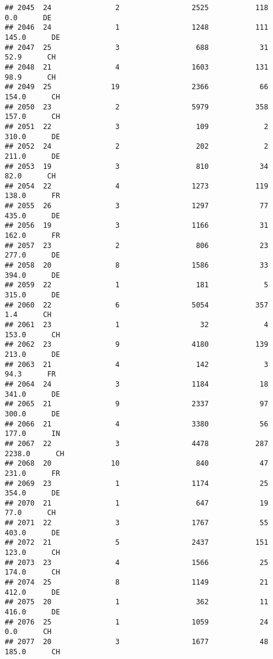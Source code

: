 \documentclass[
]{article}
\begin{document}
\begin{verbatim}
## 2045  24               2                 2525           118      0.0      DE
## 2046  24               1                 1248           111    145.0      DE
## 2047  25               3                  688            31     52.9      CH
## 2048  21               4                 1603           131     98.9      CH
## 2049  25              19                 2366            66    154.0      CH
## 2050  23               2                 5979           358    157.0      CH
## 2051  22               3                  109             2    310.0      DE
## 2052  24               2                  202             2    211.0      DE
## 2053  19               3                  810            34     82.0      CH
## 2054  22               4                 1273           119    138.0      FR
## 2055  26               3                 1297            77    435.0      DE
## 2056  19               3                 1166            31    162.0      FR
## 2057  23               2                  806            23    277.0      DE
## 2058  20               8                 1586            33    394.0      DE
## 2059  22               1                  181             5    315.0      DE
## 2060  22               6                 5054           357      1.4      CH
## 2061  23               1                   32             4    153.0      CH
## 2062  23               9                 4180           139    213.0      DE
## 2063  21               4                  142             3     94.3      FR
## 2064  24               3                 1184            18    341.0      DE
## 2065  21               9                 2337            97    300.0      DE
## 2066  21               4                 3380            56    177.0      IN
## 2067  22               3                 4478           287   2238.0      CH
## 2068  20              10                  840            47    231.0      FR
## 2069  23               1                 1174            25    354.0      DE
## 2070  21               1                  647            19     77.0      CH
## 2071  22               3                 1767            55    403.0      DE
## 2072  21               5                 2437           151    123.0      CH
## 2073  23               4                 1566            25    174.0      CH
## 2074  25               8                 1149            21    412.0      DE
## 2075  20               1                  362            11    416.0      DE
## 2076  25               1                 1059            24      0.0      CH
## 2077  20               3                 1677            48    185.0      CH

\end{verbatim}
\end{document}
